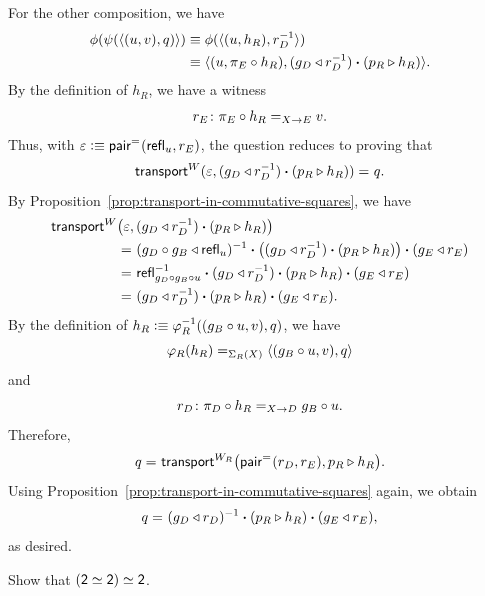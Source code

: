 \begin{solution}
    For the other composition, we have
    \begin{align*}
        \phi(\psi(\langle(u,v),q)\rangle)
            &\equiv\phi(\langle(u,h_R),r_D^{-1}\rangle)\\
            &\equiv
                \langle
                    (u,\pi_E\circ h_R),
                    (g_D\triangleleft r_D^{-1})\mathbin{\boldsymbol{\cdot}}(p_R\triangleright h_R)
                \rangle.
    \end{align*}
    By the definition of $h_R$, we have a witness
    \[
        r_E\colon\pi_E\circ h_R\eq{X\to E}v.
    \]
    Thus, with $\varepsilon\mathrel{\vcentcolon}\equiv\mathsf{pair}^{\mathrel{=_{}}}(\mathsf{refl}_u,r_E)$, the question reduces to proving that
    \[
        \mathsf{transport}^W(
            \varepsilon,(
                g_D\triangleleft r_D^{-1})\mathbin{\boldsymbol{\cdot}}(p_R\triangleright h_R)
            )\mathrel{=_{}}q.
    \]
    By Proposition~\ref{prop:transport-in-commutative-squares}, we have
    \begin{align*}
        \mathsf{transport}^W&\bigl(
            \varepsilon,
            (g_D\triangleleft r_D^{-1})\mathbin{\boldsymbol{\cdot}}(p_R\triangleright h_R)
        \bigr)\\
            &\mathrel{=_{}}(g_D\circ g_B\triangleleft\mathsf{refl}_u)^{-1}
                \mathbin{\boldsymbol{\cdot}}\bigl((g_D\triangleleft r_D^{-1})\mathbin{\boldsymbol{\cdot}}(p_R\triangleright h_R)\bigr)
                \mathbin{\boldsymbol{\cdot}}(g_E\triangleleft r_E)\\
            &\mathrel{=_{}}\mathsf{refl}_{g_D\circ g_B\circ u}^{-1}
                \mathbin{\boldsymbol{\cdot}}(g_D\triangleleft r_D^{-1})\mathbin{\boldsymbol{\cdot}}(p_R\triangleright h_R)
                \mathbin{\boldsymbol{\cdot}}(g_E\triangleleft r_E)\\
            &\mathrel{=_{}}(g_D\triangleleft r_D^{-1})\mathbin{\boldsymbol{\cdot}}(p_R\triangleright h_R)\mathbin{\boldsymbol{\cdot}}(g_E\triangleleft r_E).
    \end{align*}
    By the definition of $h_R\mathrel{\vcentcolon}\equiv\varphi_R^{-1}((g_B\circ u,v),q)$, we have
    \[
        \varphi_R(h_R)\mathrel{=_{\Sigma_R(X)}}\langle(g_B\circ u,v),q\rangle
    \]
    and
    \[
        r_D\colon\pi_D\circ h_R\eq{X\to D}g_B\circ u.
    \]
    Therefore,
    \[
        q\mathrel{=_{}}\mathsf{transport}^{W_R}
            \bigl(
                \mathsf{pair}^{\mathrel{=_{}}}(r_D,r_E),p_R\triangleright h_R
            \bigr).
    \]
    Using Proposition~\ref{prop:transport-in-commutative-squares} again, we obtain
    \[
        q\mathrel{=_{}}(g_D\triangleleft r_D)^{-1}\mathbin{\boldsymbol{\cdot}}(p_R\triangleright h_R)\mathbin{\boldsymbol{\cdot}}(g_E\triangleleft r_E),
    \]
    as desired.

\end{solution}

\begin{exr}\fe\label{exr:2-simeq-2-simeq-2}
    Show that\/ $(\mathsf{2}\simeq\mathsf{2})\simeq\mathsf{2}$.
\end{exr}

